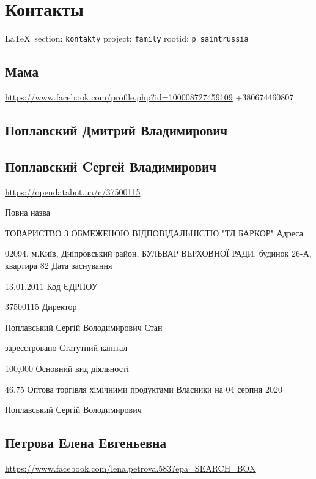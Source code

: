  
 
\section{Контакты}

\vspace{0.5cm}
 {\ifDEBUG\small\LaTeX~section: \verb|kontakty| project: \verb|family| rootid: \verb|p_saintrussia| \fi}
\vspace{0.5cm}

\subsection{Мама}
\url{https://www.facebook.com/profile.php?id=100008727459109}
+380674460807

\subsection{Поплавский Дмитрий Владимирович}


\subsection{Поплавский Cергей Владимирович}

\url{https://opendatabot.ua/c/37500115}

Повна назва

ТОВАРИСТВО З ОБМЕЖЕНОЮ ВІДПОВІДАЛЬНІСТЮ "ТД БАРКОР"
Адреса

02094, м.Київ, Дніпровський район, БУЛЬВАР ВЕРХОВНОЇ РАДИ, будинок 26-А, квартира 82
Дата заснування

13.01.2011
Код ЄДРПОУ

37500115
Директор

Поплавський Сергій Володимирович
Стан

зареєстровано
Статутний капітал

100,000
Основний вид діяльності

46.75 Оптова торгівля хімічними продуктами
Власники на 04 серпня 2020

Поплавський Сергій Володимирович

\subsection{Петрова Елена Евгеньевна}
\url{https://www.facebook.com/lena.petrova.583?epa=SEARCH_BOX}

